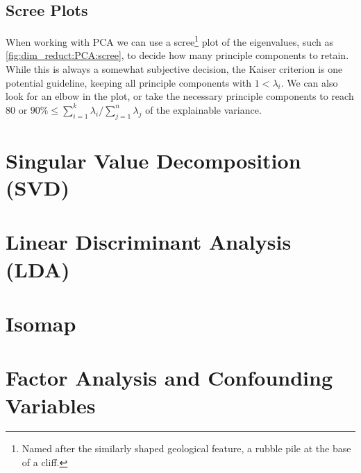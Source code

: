 \subsection{Scree Plots}
\label{dim_reduct:PCA:scree}

When working with PCA we can use a
scree\footnote{Named after the similarly shaped geological feature, a rubble pile at the base of a cliff.} plot \cite{scree}
of the eigenvalues, such as \cref{fig:dim_reduct:PCA:scree},
to decide how many principle components to retain.
While this is always a somewhat subjective decision,
the Kaiser criterion \cite{kaiser_criterion} is one potential guideline,
keeping all principle components with $1 < \lambda_{i}$.
We can also look for an elbow in the plot,
or take the necessary principle components to reach
\si{80}{\percent} or $\si{90}{\percent} \leq \sum_{i=1}^{k} \lambda_{i} / \sum_{j=1}^{n} \lambda_{j}$ of the explainable variance.

\section{Singular Value Decomposition (SVD)}
\label{dim_reduct:SVD}

\section{Linear Discriminant Analysis (LDA)}
\label{dim_reduct:LDA}


\section{Isomap}
\label{dim_reduct:isomap}

\section{Factor Analysis and Confounding Variables}
\label{dim_reduct:factor_ana}


